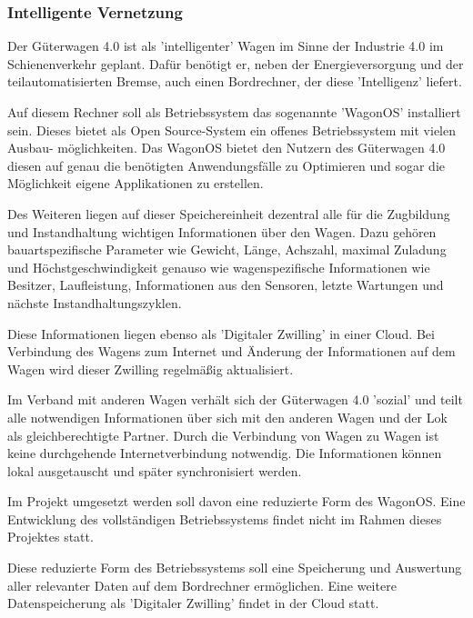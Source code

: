 \subsubsection{Intelligente Vernetzung}
Der Güterwagen 4.0 ist als 'intelligenter' Wagen im Sinne der Industrie 4.0 im Schienenverkehr geplant. Dafür benötigt er, neben der Energieversorgung und der teilautomatisierten Bremse, auch einen Bordrechner, der diese 'Intelligenz' liefert.\par
Auf diesem Rechner soll als Betriebssystem das sogenannte '\gls{WagonOS}' installiert sein. Dieses bietet als Open Source-System ein offenes Betriebssystem mit vielen Ausbau- möglichkeiten. Das \gls{WagonOS} bietet den Nutzern des Güterwagen 4.0  diesen auf genau die benötigten Anwendungsfälle zu Optimieren und sogar die Möglichkeit eigene Applikationen zu erstellen.\par
Des Weiteren liegen auf dieser Speichereinheit dezentral alle für die Zugbildung und Instandhaltung wichtigen Informationen über den Wagen. Dazu gehören bauartspezifische Parameter wie Gewicht, Länge, Achszahl, maximal Zuladung und Höchstgeschwindigkeit genauso wie wagenspezifische Informationen wie Besitzer, Laufleistung, Informationen aus den Sensoren, letzte Wartungen und nächste Instandhaltungszyklen.\par
Diese Informationen liegen ebenso als 'Digitaler Zwilling' in einer Cloud. Bei Verbindung des Wagens zum Internet und Änderung der Informationen auf dem Wagen wird dieser Zwilling regelmäßig aktualisiert.\par
Im Verband mit anderen Wagen verhält sich der Güterwagen 4.0 'sozial' und teilt alle notwendigen Informationen über sich mit den anderen Wagen und der Lok als gleichberechtigte Partner. Durch die Verbindung von Wagen zu Wagen ist keine durchgehende Internetverbindung notwendig. Die Informationen können lokal ausgetauscht und später synchronisiert werden.\par
Im Projekt umgesetzt werden soll davon eine reduzierte Form des \gls{WagonOS}. Eine Entwicklung des vollständigen Betriebssystems findet nicht im Rahmen dieses Projektes statt.\par
Diese reduzierte Form des Betriebssystems soll eine Speicherung und Auswertung aller relevanter Daten auf dem Bordrechner ermöglichen. Eine weitere Datenspeicherung als 'Digitaler Zwilling' findet in der Cloud statt.



